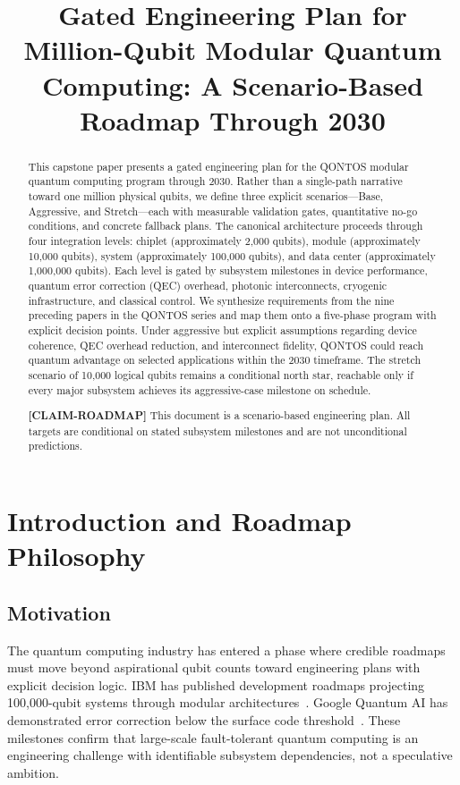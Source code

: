 \documentclass[conference]{IEEEtran}
\begin{document}
\title{Gated Engineering Plan for Million-Qubit Modular Quantum Computing: A Scenario-Based Roadmap Through 2030}
\author{\qontosauthor}
\maketitle

\begin{abstract}
This capstone paper presents a gated engineering plan for the QONTOS modular quantum computing program through 2030. Rather than a single-path narrative toward one million physical qubits, we define three explicit scenarios---Base, Aggressive, and Stretch---each with measurable validation gates, quantitative no-go conditions, and concrete fallback plans. The canonical architecture proceeds through four integration levels: chiplet (approximately 2,000 qubits), module (approximately 10,000 qubits), system (approximately 100,000 qubits), and data center (approximately 1,000,000 qubits). Each level is gated by subsystem milestones in device performance, quantum error correction (QEC) overhead, photonic interconnects, cryogenic infrastructure, and classical control. We synthesize requirements from the nine preceding papers in the QONTOS series and map them onto a five-phase program with explicit decision points. Under aggressive but explicit assumptions regarding device coherence, QEC overhead reduction, and interconnect fidelity, QONTOS could reach quantum advantage on selected applications within the 2030 timeframe. The stretch scenario of 10,000 logical qubits remains a conditional north star, reachable only if every major subsystem achieves its aggressive-case milestone on schedule.

\textbf{[CLAIM-ROADMAP]} This document is a scenario-based engineering plan. All targets are conditional on stated subsystem milestones and are not unconditional predictions.
\end{abstract}

\section{Introduction and Roadmap Philosophy}

\subsection{Motivation}

The quantum computing industry has entered a phase where credible roadmaps must move beyond aspirational qubit counts toward engineering plans with explicit decision logic. IBM has published development roadmaps projecting 100,000-qubit systems through modular architectures~\cite{ibm2024}. Google Quantum AI has demonstrated error correction below the surface code threshold~\cite{google2024}. These milestones confirm that large-scale fault-tolerant quantum computing is an engineering challenge with identifiable subsystem dependencies, not a speculative ambition.
\end{document}
